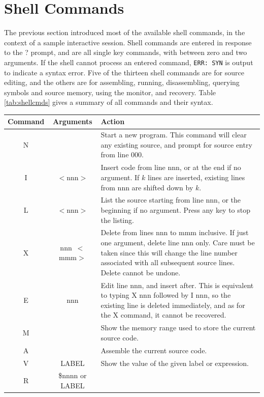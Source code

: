 \documentclass[12pt]{article}
\newcommand{\replica}[1]{\textsf{#1}}
\begin{document}
\section{Shell Commands}

The previous section introduced most of the available shell commands, in the context of a sample interactive session.
Shell commands are entered in response to the \replica{?} prompt, and are all single key commands, with between zero and two arguments.  If the shell cannot process an entered command, \texttt{ERR: SYN} is output to indicate a syntax error.  Five of the thirteen shell commands are for source editing, and the others are for assembling, running, disassembling, querying symbols and source memory, using the monitor, and recovery.
Table \ref{tab:shellcmds} gives a summary of all commands and their syntax.
\begin{table}[p]
	\centering
	\begin{tabular}{|c|c|p{10cm}|} \hline
	\textbf{Command} & \textbf{Arguments} & \textbf{Action} \tabularnewline
	\hline
	\replica{N} & & Start a new program.  This command will
									clear any existing source, and prompt
									for source entry from line 000.\tabularnewline
	\replica{I} & $<$\replica{nnn}$>$ & Insert code from line \replica{nnn}, or at
									the end if no argument.  If $k$ lines are inserted, existing
									lines from \replica{nnn} are shifted down by $k$.\tabularnewline
	\replica{L} & $<$\replica{nnn}$>$ & List the source starting from line
									\replica{nnn}, or the beginning if no argument.  Press any key
									to stop the listing.\tabularnewline
	\replica{X} & \replica{nnn~}$<$\replica{mmm}$>$ & Delete from lines
									\replica{nnn} to \replica{mmm} inclusive.  If just one
									argument, delete line \replica{nnn} only.  Care must be taken
									since this will change the line number associated with all
									subsequent source lines.  Delete cannot be undone.\tabularnewline
	\replica{E} & \replica{nnn} & Edit line \replica{nnn}, and insert after.
									This is equivalent to typing \replica{X nnn} followed by
									\replica{I nnn}, so the existing line is deleted
									immediately, and as for the \replica{X} command, it
									cannot be recovered.\tabularnewline
	\replica{M} & & Show the memory range used to store the current source 
									code.\tabularnewline
	\replica{A} & & Assemble the current source code.\tabularnewline
	\replica{V} & \replica{LABEL} & Show the value of the given label or expression.\tabularnewline
	\replica{R} & \replica{\$nnnn} or \replica{LABEL} & 

\end{tabular}
\end{table}
\end{document}
